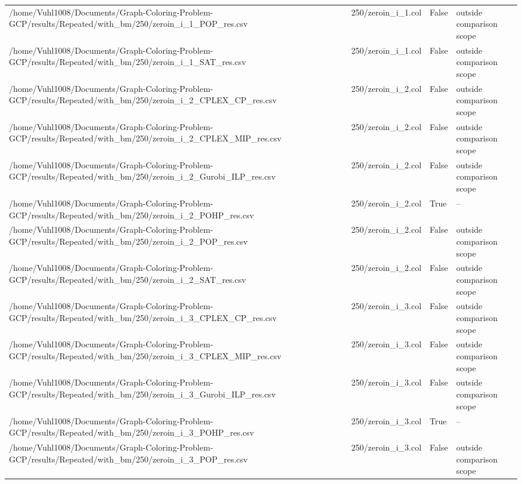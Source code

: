 \begin{table}[htbp]
\begin{tabular}{llll}
/home/Vuhl1008/Documents/Graph-Coloring-Problem-GCP/results/Repeated/with\_bm/250/zeroin\_i\_1\_POP\_res.csv & 250/zeroin\_i\_1.col & False & outside comparison scope \\
/home/Vuhl1008/Documents/Graph-Coloring-Problem-GCP/results/Repeated/with\_bm/250/zeroin\_i\_1\_SAT\_res.csv & 250/zeroin\_i\_1.col & False & outside comparison scope \\
/home/Vuhl1008/Documents/Graph-Coloring-Problem-GCP/results/Repeated/with\_bm/250/zeroin\_i\_2\_CPLEX\_CP\_res.csv & 250/zeroin\_i\_2.col & False & outside comparison scope \\
/home/Vuhl1008/Documents/Graph-Coloring-Problem-GCP/results/Repeated/with\_bm/250/zeroin\_i\_2\_CPLEX\_MIP\_res.csv & 250/zeroin\_i\_2.col & False & outside comparison scope \\
/home/Vuhl1008/Documents/Graph-Coloring-Problem-GCP/results/Repeated/with\_bm/250/zeroin\_i\_2\_Gurobi\_ILP\_res.csv & 250/zeroin\_i\_2.col & False & outside comparison scope \\
/home/Vuhl1008/Documents/Graph-Coloring-Problem-GCP/results/Repeated/with\_bm/250/zeroin\_i\_2\_POHP\_res.csv & 250/zeroin\_i\_2.col & True & -- \\
/home/Vuhl1008/Documents/Graph-Coloring-Problem-GCP/results/Repeated/with\_bm/250/zeroin\_i\_2\_POP\_res.csv & 250/zeroin\_i\_2.col & False & outside comparison scope \\
/home/Vuhl1008/Documents/Graph-Coloring-Problem-GCP/results/Repeated/with\_bm/250/zeroin\_i\_2\_SAT\_res.csv & 250/zeroin\_i\_2.col & False & outside comparison scope \\
/home/Vuhl1008/Documents/Graph-Coloring-Problem-GCP/results/Repeated/with\_bm/250/zeroin\_i\_3\_CPLEX\_CP\_res.csv & 250/zeroin\_i\_3.col & False & outside comparison scope \\
/home/Vuhl1008/Documents/Graph-Coloring-Problem-GCP/results/Repeated/with\_bm/250/zeroin\_i\_3\_CPLEX\_MIP\_res.csv & 250/zeroin\_i\_3.col & False & outside comparison scope \\
/home/Vuhl1008/Documents/Graph-Coloring-Problem-GCP/results/Repeated/with\_bm/250/zeroin\_i\_3\_Gurobi\_ILP\_res.csv & 250/zeroin\_i\_3.col & False & outside comparison scope \\
/home/Vuhl1008/Documents/Graph-Coloring-Problem-GCP/results/Repeated/with\_bm/250/zeroin\_i\_3\_POHP\_res.csv & 250/zeroin\_i\_3.col & True & -- \\
/home/Vuhl1008/Documents/Graph-Coloring-Problem-GCP/results/Repeated/with\_bm/250/zeroin\_i\_3\_POP\_res.csv & 250/zeroin\_i\_3.col & False & outside comparison scope \\

\end{tabular}
\end{table}
